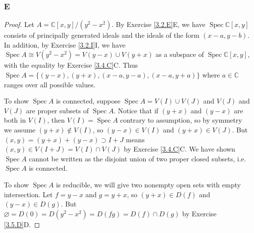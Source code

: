 \documentclass{article}
\newcommand{\C}{\mathbb{C}}
\DeclareMathOperator{\Spec}{\mathrm{Spec}}
\let\emptyset\varnothing
\begin{document}
\subsubsection{E}\label{3.6.E}
\begin{proof}
    Let $A=\C[x,y]/(y^2-x^2)$. By Exercise \ref{3.2.E}E, we have $\Spec \C[x,y]$ consists of principally generated ideals and the ideals of the form $(x-a,y-b)$. In addition, by Exercise \ref{3.2.I}I, we have $\Spec A \cong V(y^2-x^2)=V(y-x)\cup V(y+x)$ as a subspace of $\Spec \C[x,y]$, with the equality by Exercise \ref{3.4.C}C. Thus $\Spec A = \{(y-x),(y+x), (x-a,y-a), (x-a, y+a)\}$ where $a\in \C$ ranges over all possible values.
    
    To show $\Spec A$ is connected, suppose $\Spec A = V(I)\cup V(J)$ and $V(J)$ and $V(J)$ are proper subsets of $\Spec A$. Notice that if $(y+x)$ and $(y-x)$ are both in $V(I)$, then $V(I)=\Spec A$ contrary to assumption, so by symmetry we assume $(y+x)\notin V(I)$, so $(y-x)\in V(I)$ and $(y+x)\in V(J)$. But $(x,y)= (y+x) + (y-x)\supset I+J$ means $(x,y)\in V(I+J) = V(I)\cap V(J)$ by Exercise \ref{3.4.C}C. We have shown $\Spec A$ cannot be written as the disjoint union of two proper closed subsets, i.e. $\Spec A$ is connected.

    To show $\Spec A$ is reducible, we will give two nonempty open sets with empty intersection. Let $f=y-x$ and $g=y+x$, so $(y+x)\in D(f)$ and $(y-x)\in D(g)$. But $\emptyset = D(0)=D(y^2-x^2)=D(fg)=D(f)\cap D(g)$ by Exercise \ref{3.5.D}D.
\end{proof}
\end{document}
